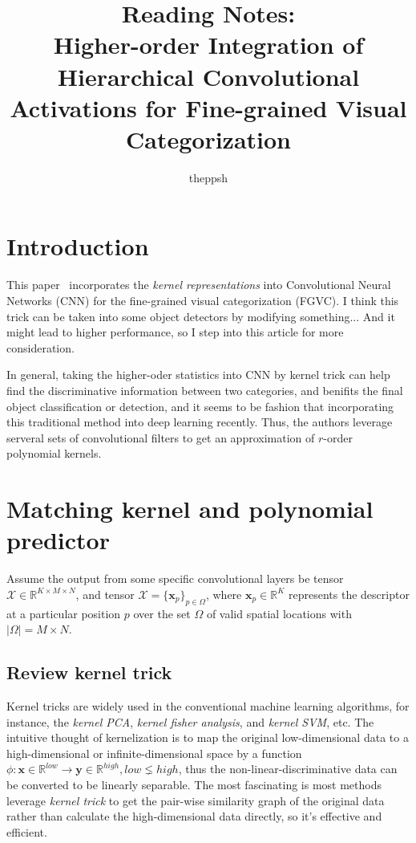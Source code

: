 \documentclass[a4paper,4pt]{article}
\author {theppsh}
\title {Reading Notes:\\Higher-order Integration of 
    Hierarchical Convolutional Activations for 
    Fine-grained Visual Categorization}
\begin{document}
\maketitle

\section{Introduction}
This paper~\cite{cai2017higher} incorporates the 
\emph{kernel representations} into Convolutional 
Neural Networks (CNN) for the fine-grained visual categorization (FGVC).
I think this trick can be taken into some object detectors by modifying something... And it might 
lead to higher performance, so I step into this article for more consideration.

In general, taking the higher-oder statistics into CNN by kernel trick can help find the 
discriminative information between two categories, and benifits the final object 
classification or detection, and it seems to be fashion that incorporating this traditional method 
into deep learning recently.
Thus, the authors leverage serveral sets of convolutional filters to get an approximation of
$r$-order polynomial kernels.

\section{Matching kernel and polynomial predictor}
Assume the output from some specific convolutional layers 
be tensor $\bm{\mathcal{X}} \in \mathbb{R}^{K\times M \times N} $, and
tensor $\bm{\mathcal{X}}= \{\bm{x}_p \}_{p \in \Omega}$, where $\bm{x}_p \in \mathbb{R}^K$
represents the descriptor at a particular position $p$ over the set $\Omega$ of 
valid spatial locations with $\lvert \Omega \rvert = M\times N$.

\subsection{Review kernel trick}

Kernel tricks are widely used in the conventional machine learning algorithms, for instance,
the \emph{kernel PCA}, \emph{kernel fisher analysis}, and \emph{kernel SVM}, etc. The intuitive thought 
of kernelization is to map the original low-dimensional data to a high-dimensional or
infinite-dimensional space by a function 
$\phi: \bm{x} \in \mathbb{R}^{low} \rightarrow \bm{y}\in \mathbb{R}^{high}, low \lneq high$,
thus the non-linear-discriminative data 
can be converted to be linearly separable. The most fascinating is
most methods leverage \emph{kernel trick} to get the pair-wise similarity graph of the original data
rather than calculate the high-dimensional data directly, so it's effective and efficient.
\end{document}
